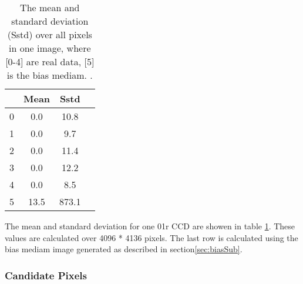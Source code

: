 \documentclass[12pt,twoside,letterpaper]{article}
\begin{document}
    \begin{table}[!hbtp]
    \begin{center}
    \begin{tabular}{|c|c|c|c|}
 \hline
                             & Mean                     &Sstd                                      \\
 \hline                                                                      
           0                 &  0.0                     &  10.8                                    \\
           1                 &  0.0                     &   9.7                                    \\
           2                 &  0.0                     &  11.4                                    \\
           3                 &  0.0                     &  12.2                                    \\
           4                 &  0.0                     &   8.5                                    \\
           5                 & 13.5                     & 873.1                                    \\
 \hline
    \end{tabular}
     \caption{The mean and standard deviation (Sstd) over all pixels in one
     image, where [0-4] are real data, [5] is the bias mediam. 
. }
     \label{Table:ImageStat_hotStrip}
    \end{center}
    \end{table}


The mean and standard deviation for one 01r CCD are showen in table \ref{Table:ImageStat_hotStrip}. These values are calculated over 4096 * 4136 pixels. The last row is calculated using the bias mediam image generated as described in section\ref{sec:biasSub}. 



\subsubsection{Candidate Pixels} 
\end{document}
